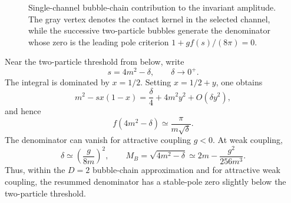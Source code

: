 \begin{figure}[!ht]
\centering
{}
\caption{Single-channel bubble-chain contribution to the invariant amplitude.
The gray vertex denotes the contact kernel in the selected channel, while the
successive two-particle bubbles generate the denominator whose zero is the
leading pole criterion \(1+g f(s)/(8\pi)=0\).}
\label{fig:chain-amplitude-single-channel}
\end{figure}

Near the two-particle threshold from below, write
\[
  s=4m^2-\delta,
  \qquad
  \delta\to0^+ .
\]
The integral is dominated by \(x=1/2\). Setting \(x=1/2+y\), one obtains
\[
  m^2-sx(1-x)
  =
  \frac{\delta}{4}+4m^2y^2+O(\delta y^2),
\]
and hence
\[
  f(4m^2-\delta)
  \simeq
  \frac{\pi}{m\sqrt{\delta}} .
\]
The denominator can vanish for attractive coupling \(g<0\). At weak
coupling,
\[
  \delta
  \simeq
  \left(\frac{g}{8m}\right)^2,
  \qquad
  M_B
  =
  \sqrt{4m^2-\delta}
  \simeq
  2m-\frac{g^2}{256m^3}.
\]
Thus, within the \(D=2\) bubble-chain approximation and for attractive weak
coupling, the resummed denominator has a stable-pole zero slightly below the
two-particle threshold.

